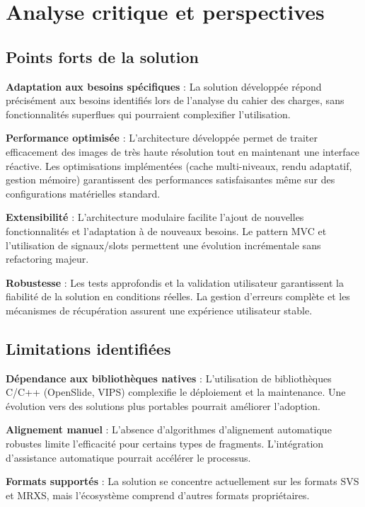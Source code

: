\documentclass[12pt,a4paper]{report}
\begin{document}
\section{Analyse critique et perspectives}

\subsection{Points forts de la solution}

\textbf{Adaptation aux besoins spécifiques} : La solution développée répond précisément aux besoins identifiés lors de l'analyse du cahier des charges, sans fonctionnalités superflues qui pourraient complexifier l'utilisation.

\textbf{Performance optimisée} : L'architecture développée permet de traiter efficacement des images de très haute résolution tout en maintenant une interface réactive. Les optimisations implémentées (cache multi-niveaux, rendu adaptatif, gestion mémoire) garantissent des performances satisfaisantes même sur des configurations matérielles standard.

\textbf{Extensibilité} : L'architecture modulaire facilite l'ajout de nouvelles fonctionnalités et l'adaptation à de nouveaux besoins. Le pattern MVC et l'utilisation de signaux/slots permettent une évolution incrémentale sans refactoring majeur.

\textbf{Robustesse} : Les tests approfondis et la validation utilisateur garantissent la fiabilité de la solution en conditions réelles. La gestion d'erreurs complète et les mécanismes de récupération assurent une expérience utilisateur stable.

\subsection{Limitations identifiées}

\textbf{Dépendance aux bibliothèques natives} : L'utilisation de bibliothèques C/C++ (OpenSlide, VIPS) complexifie le déploiement et la maintenance. Une évolution vers des solutions plus portables pourrait améliorer l'adoption.

\textbf{Alignement manuel} : L'absence d'algorithmes d'alignement automatique robustes limite l'efficacité pour certains types de fragments. L'intégration d'assistance automatique pourrait accélérer le processus.

\textbf{Formats supportés} : La solution se concentre actuellement sur les formats SVS et MRXS, mais l'écosystème comprend d'autres formats propriétaires.
\end{document}
